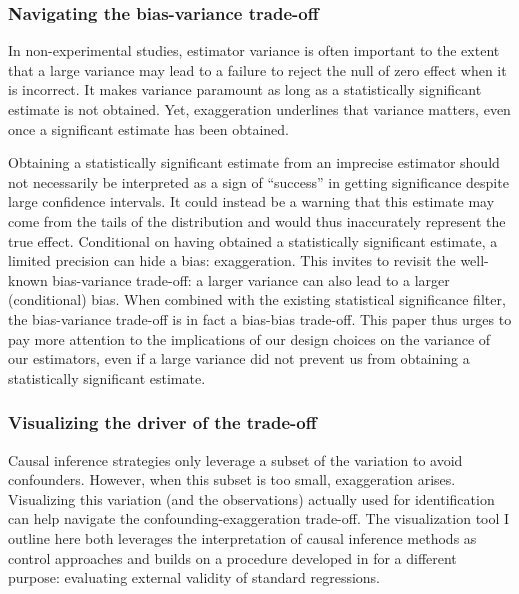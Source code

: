 \documentclass[usletter, 12pt]{article}
\begin{document}
		
			\subsubsection{Navigating the bias-variance trade-off}
			
				In non-experimental studies, estimator variance is often important to the extent that a large variance may lead to a failure to reject the null of zero effect when it is incorrect. It makes variance paramount as long as a statistically significant estimate is not obtained. Yet, exaggeration underlines that variance matters, even once a significant estimate has been obtained. 
			
				 Obtaining a statistically significant estimate from an imprecise estimator should not necessarily be interpreted as a sign of ``success'' in getting significance despite large confidence intervals. It could instead be a warning that this estimate may come from the tails of the distribution and would thus inaccurately represent the true effect. Conditional on having obtained a statistically significant estimate, a limited precision can hide a bias: exaggeration. This invites to revisit the well-known bias-variance trade-off: a larger variance can also lead to a larger (conditional) bias. When combined with the existing statistical significance filter, the bias-variance trade-off is in fact a bias-bias trade-off. This paper thus urges to pay more attention to the implications of our design choices on the variance of our estimators, even if a large variance did not prevent us from obtaining a statistically significant estimate.
			
			\subsubsection{Visualizing the driver of the trade-off}
		
				Causal inference strategies only leverage a subset of the variation to avoid confounders. However, when this subset is too small, exaggeration arises. Visualizing this variation (and the observations) actually used for identification can help navigate the confounding-exaggeration trade-off. The visualization tool I outline here both leverages the interpretation of causal inference methods as control approaches and builds on a procedure developed in \cite{aronow_does_2016} for a different purpose: evaluating external validity of standard regressions.
				
\end{document}
